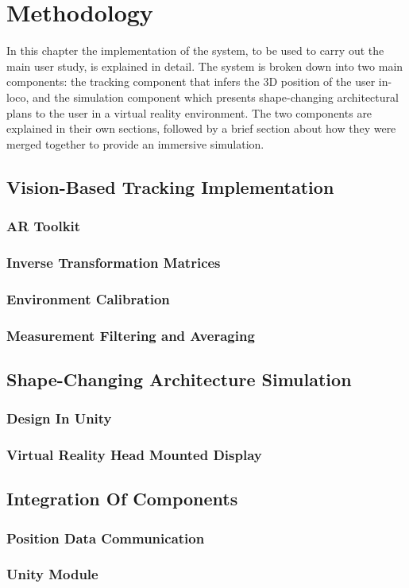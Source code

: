 \chapter{Methodology}

In this chapter the implementation of the system, to be used to carry out the main user study, is explained in detail. The system is broken down into two main components: the tracking component that infers the 3D position of the user in-loco, and the simulation component which presents shape-changing architectural plans to the user in a virtual reality environment. The two components are explained in their own sections, followed by a brief section about how they were merged together to provide an immersive simulation.

\section{Vision-Based Tracking Implementation}

\subsection{AR Toolkit}

\subsection{Inverse Transformation Matrices}

\subsection{Environment Calibration}

\subsection{Measurement Filtering and Averaging}

\section{Shape-Changing Architecture Simulation}

\subsection{Design In Unity}

\subsection{Virtual Reality Head Mounted Display}

\section{Integration Of Components}

\subsection{Position Data Communication}

\subsection{Unity Module}